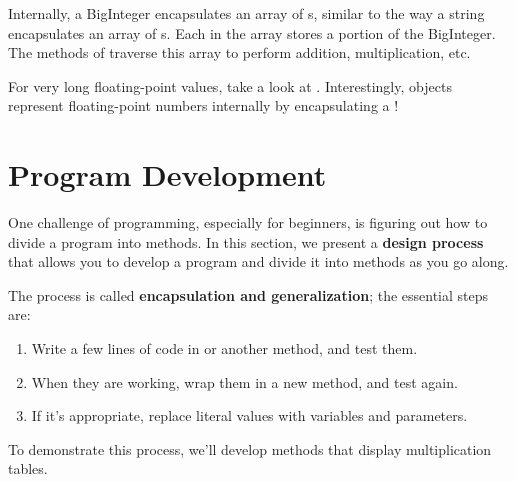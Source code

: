 Internally, a BigInteger encapsulates an array of s, similar to the way a string encapsulates an array of s.
Each  in the array stores a portion of the BigInteger.
The methods of  traverse this array to perform addition, multiplication, etc.

For very long floating-point values, take a look at .
Interestingly,  objects represent floating-point numbers internally by encapsulating a !



\section{Program Development}
\label{encapsulation}




One challenge of programming, especially for beginners, is figuring out how to divide a program into methods.
In this section, we present a {\bf design process} that allows you to develop a program and divide it into methods as you go along.

The process is called {\bf encapsulation and generalization}; the essential steps are:

\begin{enumerate}
\item Write a few lines of code in  or another method, and test them.
\item When they are working, wrap them in a new method, and test again.
\item If it's appropriate, replace literal values with variables and parameters.
\end{enumerate}


To demonstrate this process, we'll develop methods that display multiplication tables.

